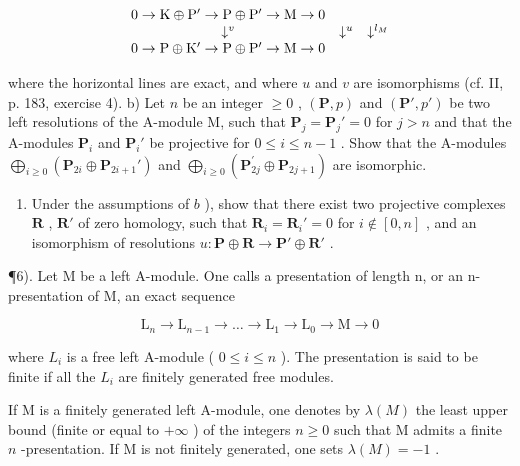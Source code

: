 \[
\begin{array}{c c c}0 \rightarrow \mathrm{K} \oplus \mathrm{P} ^ {\prime} \rightarrow \mathrm{P} \oplus \mathrm{P} ^ {\prime} \rightarrow \mathrm{M} \rightarrow 0\\\downarrow^ {v}&\downarrow^ {u}&\downarrow^ {l _ {M}}\\0 \rightarrow \mathrm{P} \oplus \mathrm{K} ^ {\prime} \rightarrow \mathrm{P} \oplus \mathrm{P} ^ {\prime} \rightarrow \mathrm{M} \rightarrow 0\end{array}
\]

where the horizontal lines are exact, and where \(u\) and \(v\) are isomorphisms (cf. II, p. 183, exercise 4). b) Let \(n\) be an integer \(\geqslant 0\) , \((\mathbf{P}, p)\) and \((\mathbf{P}', p')\) be two left resolutions of the A-module M, such that \(\mathbf{P}_j = \mathbf{P}_j' = 0\) for \(j > n\) and that the A-modules \(\mathbf{P}_i\) and \(\mathbf{P}_i'\) be projective for \(0 \leqslant i \leqslant n - 1\) . Show that the A-modules \(\bigoplus_{i \geqslant 0} (\mathbf{P}_{2i} \oplus \mathbf{P}_{2i+1}')\) and \(\bigoplus_{i \geqslant 0} (\mathbf{P}_{2j}^{\prime} \oplus \mathbf{P}_{2j+1})\) are isomorphic.

\begin{enumerate}
\def\labelenumi{\alph{enumi})}
\setcounter{enumi}{2}
\tightlist
\item
  Under the assumptions of \(b\) ), show that there exist two projective complexes \(\mathbf{R}\) , \(\mathbf{R}'\) of zero homology, such that \(\mathbf{R}_i = \mathbf{R}_i' = 0\) for \(i \notin [0, n]\) , and an isomorphism of resolutions \(u: \mathbf{P} \oplus \mathbf{R} \to \mathbf{P}' \oplus \mathbf{R}'\) .
\end{enumerate}

¶6). Let M be a left A-module. One calls a presentation of length n, or an n-presentation of M, an exact sequence

\[
\mathrm{L} _ {n} \rightarrow \mathrm{L} _ {n - 1} \rightarrow \dots \rightarrow \mathrm{L} _ {1} \rightarrow \mathrm{L} _ {0} \rightarrow \mathrm{M} \rightarrow 0
\]

where \(L_{i}\) is a free left A-module ( \(0 \leqslant i \leqslant n\) ). The presentation is said to be finite if all the \(L_{i}\) are finitely generated free modules.

If M is a finitely generated left A-module, one denotes by \(\lambda(M)\) the least upper bound (finite or equal to \(+\infty\) ) of the integers \(n \geqslant 0\) such that M admits a finite \(n\) -presentation. If M is not finitely generated, one sets \(\lambda(M) = -1\) .

